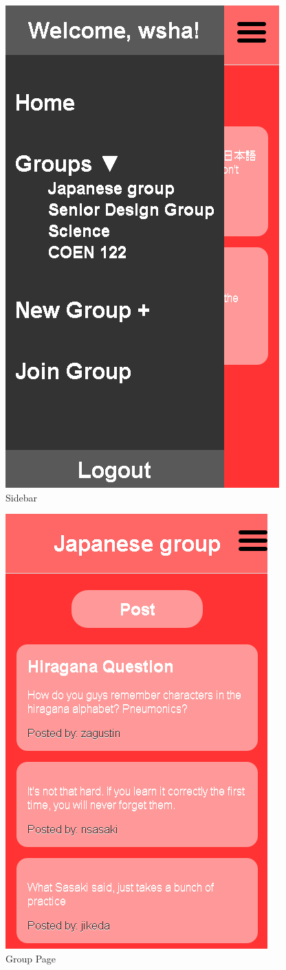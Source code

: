 \begin{figure}[h]
	\centering
	\includegraphics[scale=0.5]{images/sidebar.png}
	\caption{Sidebar}
	\label{fig:sidebar}
\end{figure}

\begin{figure}[h]
	\centering
	\includegraphics[scale=0.6]{images/group_pic.png}
	\caption{Group Page}
	\label{fig:group page}
\end{figure}